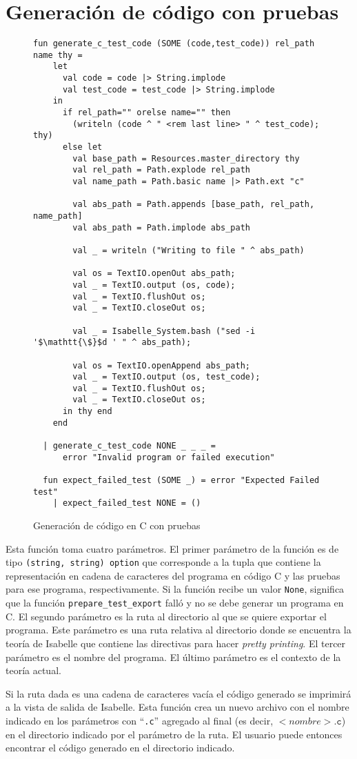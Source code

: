 \chapter{Generación de código con pruebas}
\label{ap:generate_c_test_code}

\begin{figure}
\begin{lstlisting}[mathescape=true]
  fun generate_c_test_code (SOME (code,test_code)) rel_path name thy =
    let
      val code = code |> String.implode
      val test_code = test_code |> String.implode
    in
      if rel_path="" orelse name="" then
        (writeln (code ^ " <rem last line> " ^ test_code); thy)
      else let
        val base_path = Resources.master_directory thy
        val rel_path = Path.explode rel_path
        val name_path = Path.basic name |> Path.ext "c"

        val abs_path = Path.appends [base_path, rel_path, name_path]
        val abs_path = Path.implode abs_path

        val _ = writeln ("Writing to file " ^ abs_path)

        val os = TextIO.openOut abs_path;
        val _ = TextIO.output (os, code);
        val _ = TextIO.flushOut os;
        val _ = TextIO.closeOut os;

        val _ = Isabelle_System.bash ("sed -i '$\mathtt{\$}$d ' " ^ abs_path);

        val os = TextIO.openAppend abs_path;
        val _ = TextIO.output (os, test_code);
        val _ = TextIO.flushOut os;
        val _ = TextIO.closeOut os;
      in thy end
    end

  | generate_c_test_code NONE _ _ _ =
      error "Invalid program or failed execution"

  fun expect_failed_test (SOME _) = error "Expected Failed test"
    | expect_failed_test NONE = ()
\end{lstlisting}
\caption{Generación de código en C con pruebas}
\end{figure}

Esta función toma cuatro parámetros.
El primer parámetro de la función es de tipo \verb|(string, string) option| que corresponde a la tupla que contiene la representación en cadena de caracteres del programa en código C y las pruebas para ese programa, respectivamente.
Si la función recibe un valor \verb|None|, significa que la función \verb|prepare_test_export| falló y no se debe generar un programa en C.
El segundo parámetro es la ruta al directorio al que se quiere exportar el programa.
Este parámetro es una ruta relativa al directorio donde se encuentra la teoría de Isabelle que contiene las directivas para hacer \textit{pretty printing}.
El tercer parámetro es el nombre del programa.
El último parámetro es el contexto de la teoría actual.

Si la ruta dada es una cadena de caracteres vacía el código generado se imprimirá a la vista de salida de Isabelle.
Esta función crea un nuevo archivo con el nombre indicado en los parámetros con ``\verb|.c|'' agregado al final (es decir, $<nombre>\mathtt{.c}$) en el directorio indicado por el parámetro de la ruta.
El usuario puede entonces encontrar el código generado en el directorio indicado.
